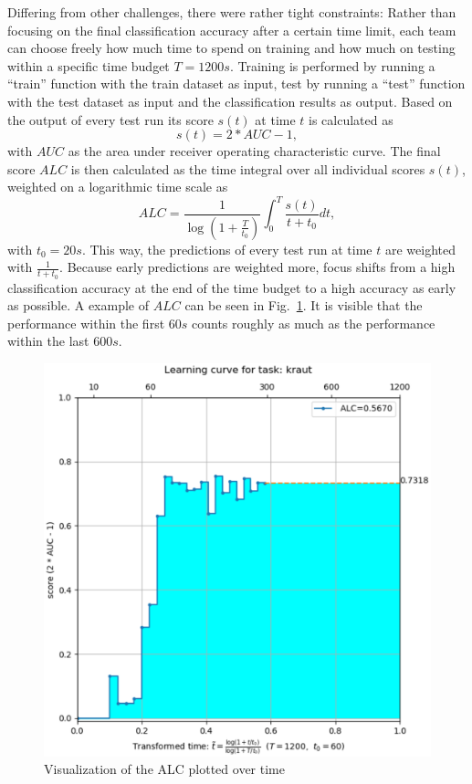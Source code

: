 \documentclass{article}
\begin{document}
Differing from other challenges, there were rather tight constraints: Rather than focusing on the final classification accuracy after a certain time limit, each team can choose freely how much time to spend on training and how much on testing within a specific time budget $T=1200s$. Training is performed by running a ``train'' function with the train dataset as input, test by running a ``test'' function with the test dataset as input and the classification results as output. Based on the output of every test run its score $s(t)$ at time $t$ is calculated as 
%
\begin{equation}
s(t) = 2*AUC - 1, \nonumber
\end{equation} 
%
with $AUC$ as the area under receiver operating characteristic curve. The final score $ALC$ is then calculated as the time integral over all individual scores $s(t)$, weighted on a logarithmic time scale as
%
\begin{equation}
ALC = \frac{1}{\log \left( 1 + \frac{T}{t_0} \right)} \int_0^T \frac{s(t)}{t+t_0} dt, \nonumber
\label{eq:ALC}
\end{equation} 
%
with $t_0=20s$. This way, the predictions of every test run at time $t$ are weighted with $\frac{1}{t+t_0}$. Because early predictions are weighted more, focus shifts from a high classification accuracy at the end of the time budget to a high accuracy as early as possible. A example of $ALC$ can be seen in Fig.~\ref{fig:learningCurveExample}. It is visible that the performance within the first $60s$ counts roughly as much as the performance within the last $600s$.
%
\begin{figure}[htb]
\begin{center}
 	\includegraphics[width=0.95\linewidth]{../figures/learning-curve-example.eps} 
\end{center}
\caption{Visualization of the ALC plotted over time}
\label{fig:learningCurveExample}
\end{figure} 
\end{document}
